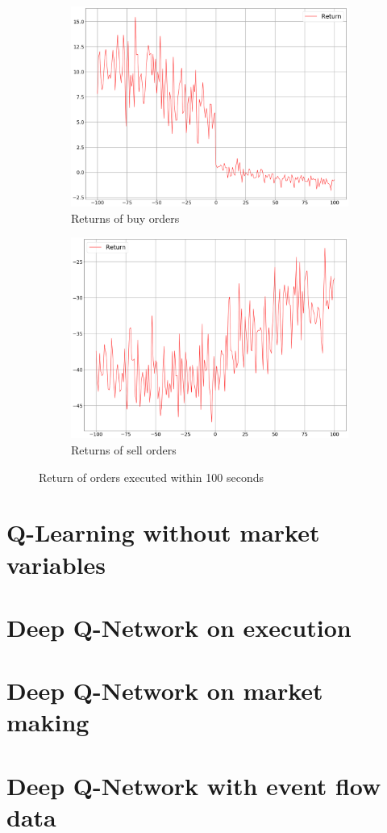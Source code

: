 \begin{figure}[H]
    \centering
    \begin{subfigure}[b]{0.45\textwidth}
        \includegraphics[width=\textwidth]{images/behaviour-100s-buy.png}
        \caption{Returns of buy orders}
        \label{fig:behvaiour-100s-buy}
    \end{subfigure}
    \begin{subfigure}[b]{0.45\textwidth}
        \includegraphics[width=\textwidth]{images/behaviour-100s-sell.png}
        \caption{Returns of sell orders}
        \label{fig:behvaiour-100s-sell}
    \end{subfigure}
    \caption{Return of orders executed within 100 seconds}
\end{figure}

\section{Q-Learning without market variables}

\section{Deep Q-Network on execution}

\section{Deep Q-Network on market making}

\section{Deep Q-Network with event flow data}
